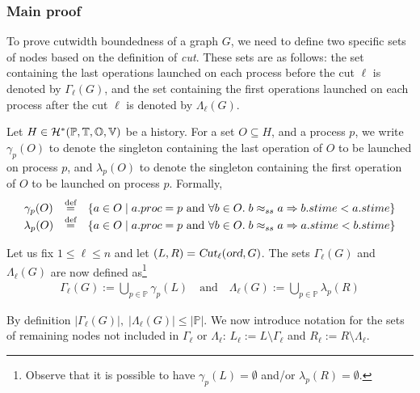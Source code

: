 \subsubsection{Main proof}

To prove cutwidth boundedness of a graph $G$, we need to define two specific sets of nodes  based on the definition of \textsl{cut}. These sets are as follows: the set containing the last operations launched on each process before the cut $\ell$ is denoted by $\Gamma_\ell(G)$, and the set containing the first operations launched on each process after the cut $\ell$ is denoted by $\Lambda_\ell(G)$. 

Let $H\in\mathcal{H}^*(\mathbb{P}, \mathbb{T}, \mathbb{O}, \mathbb{V})$ be a history. For a set $O\subseteq H$, and a process $p$, 
we write $\gamma_p(O)$ to denote the singleton containing the last operation of $O$ to be launched on process $p$, and $\lambda_p(O)$ to denote the singleton containing the first operation of $O$ to be launched on process $p$. Formally,
$$
\begin{array}{ccl}
    \gamma_p(O) & \stackrel{\text{def}}{=} & \{a\in O\mid a.proc=p \mbox{ and }\forall b\in O.\;b\approx_{ss}a\Rightarrow b.stime < a.stime \} \\
    \lambda_p(O) & \stackrel{\text{def}}{=} & \{a\in O\mid  a.proc=p \mbox{ and }\forall b\in O.\;b\approx_{ss}a\Rightarrow a.stime < b.stime \}
\end{array}
$$

Let us fix $1\leq\ell\leq n$ and let $(L,R)=\textsl{Cut}_\ell(\textsl{ord},G)$.
The sets \mbox{$\Gamma_\ell(G)$} and \mbox{$\Lambda_\ell(G)$} are now defined as\footnote{
Observe that it is possible to have \mbox{$\gamma_p(L)=\emptyset$} and/or \mbox{$\lambda_p(R)=\emptyset$}.}
\begin{gather*}
\Gamma_\ell(G) := \displaystyle\bigcup_{p \in \mathbb{P}}\gamma_p(L)
\quad\text{and}\quad
\Lambda_\ell(G) := \displaystyle\bigcup_{p \in \mathbb{P}}\lambda_p(R)
\end{gather*}

\noindent By definition $|\Gamma_\ell(G)|,\;|\Lambda_\ell(G)|\leq|\mathbb{P}|$. We now introduce notation for the sets of remaining nodes not included in $\Gamma_\ell$ or $\Lambda_\ell$: $L_\ell := L \setminus \Gamma_\ell $ and $R_\ell := R \setminus \Lambda_\ell$.

